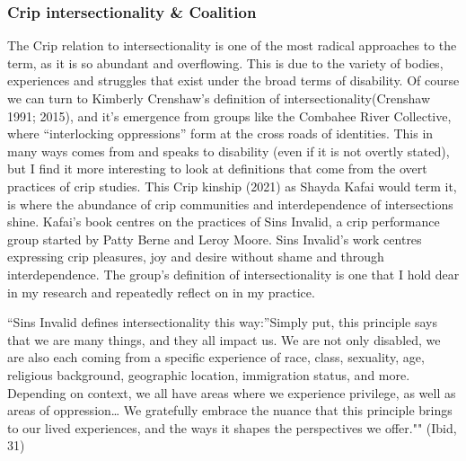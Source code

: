 \hypertarget{crip-intersectionality-coalition}{%
\subsubsection[Crip intersectionality \&
Coalition]{\texorpdfstring{\protect\hypertarget{anchor}{}{}Crip
intersectionality \&
Coalition}{Crip intersectionality \& Coalition}}\label{crip-intersectionality-coalition}}

The Crip relation to intersectionality is one of the most radical
approaches to the term, as it is so abundant and overflowing. This is
due to the variety of bodies, experiences and struggles that exist under
the broad terms of disability. Of course we can turn to Kimberly
Crenshaw's definition of intersectionality(Crenshaw 1991; 2015), and
it's emergence from groups like the Combahee River Collective, where
``interlocking oppressions'' form at the cross roads of identities. This
in many ways comes from and speaks to disability (even if it is not
overtly stated), but I find it more interesting to look at definitions
that come from the overt practices of crip studies. This Crip kinship
(2021) as Shayda Kafai would term it, is where the abundance of crip
communities and interdependence of intersections shine. Kafai's book
centres on the practices of Sins Invalid, a crip performance group
started by Patty Berne and Leroy Moore. Sins Invalid's work centres
expressing crip pleasures, joy and desire without shame and through
interdependence. The group's definition of intersectionality is one that
I hold dear in my research and repeatedly reflect on in my practice.

``Sins Invalid defines intersectionality this way:''Simply put, this
principle says that we are many things, and they all impact us. We are
not only disabled, we are also each coming from a specific experience of
race, class, sexuality, age, religious background, geographic location,
immigration status, and more. Depending on context, we all have areas
where we experience privilege, as well as areas of oppression\ldots{} We
gratefully embrace the nuance that this principle brings to our lived
experiences, and the ways it shapes the perspectives we offer."" (Ibid,
31)

